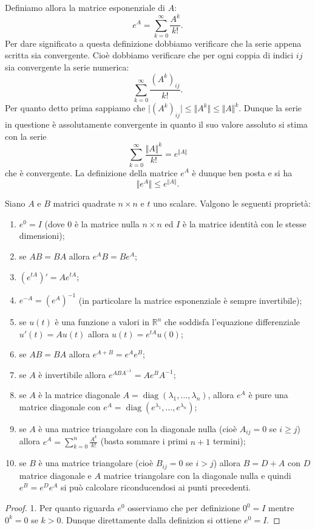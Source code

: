 \documentclass[italian,a4paper]{scrartcl}
\newcommand{\RR}{{\mathbb R}}
\DeclareMathOperator{\diag}{diag}
\begin{document}
Definiamo allora la matrice esponenziale di $A$:
\[
  e^A = \sum_{k=0}^\infty \frac{A^k}{k!}.
\]
Per dare significato a questa definizione dobbiamo verificare che la
serie appena scritta sia convergente. Cioè dobbiamo verificare che per
ogni coppia di indici $ij$ sia convergente la serie numerica:
\[
 \sum_{k=0}^\infty \frac{(A^k)_{ij}}{k!}.
\]
Per quanto detto prima sappiamo che $\lvert(A^k)_{ij}\rvert \le \Vert
A ^k\Vert \le \Vert A \Vert^k$. Dunque la serie in questione è
assolutamente convergente in quanto il suo valore assoluto si stima
con la serie
\[
 \sum_{k=0}^\infty \frac{\Vert A\Vert^k}{k!} = e^{\Vert A\Vert}
\]
che è convergente. La definizione della matrice $e^A$ è dunque 
ben posta e si ha
\[
 \Vert e^A\Vert \le e^{\Vert A \Vert}.
\]

\begin{theorem}
Siano $A$ e $B$ matrici quadrate $n\times n$ e $t$ uno scalare.
Valgono le seguenti proprietà:
\begin{enumerate}
\item $e^0 = I$ (dove $0$ è la matrice nulla $n\times n$ ed $I$ è la
  matrice identità con le stesse dimensioni);
\item se $AB=BA$ allora $e^AB = Be^A$;
\item $(e^{tA})' = A e^{tA}$;
\item $e^{-A} = (e^A)^{-1}$ (in particolare la matrice esponenziale è
  sempre invertibile);
\item se $u(t)$ è una funzione a valori in $\RR^n$ che soddisfa
  l'equazione differenziale $u'(t) = Au(t)$ allora $u(t) = e^{tA} u(0)$;
\item se $AB=BA$ allora $e^{A+B} = e^A e^B$;
\item se $A$ è invertibile allora $e^{ABA^{-1}} = Ae^BA^{-1}$;
\item se $A$ è la matrice diagonale $A = \diag(\lambda_1, \dots, \lambda_n)$, allora $e^A$
 è pure una matrice diagonale con $e^A = \diag(e^{\lambda_1},\dots, e^{\lambda_n})$;
\item se $A$ è una matrice triangolare con la diagonale nulla (cioè
  $A_{ij}=0$ se $i\ge j$) allora $e^A = \sum_{k=0}^n \frac{A^k}{k!}$
  (basta sommare i primi $n+1$ termini);
\item se $B$ è una matrice triangolare (cioè $B_{ij}=0$ se $i > j$)
  allora $B = D + A$ con $D$ matrice diagonale e $A$ matrice
  triangolare con la diagonale nulla e quindi $e^B = e^De^A$ si può
  calcolare riconducendosi ai punti precedenti.
\end{enumerate}
\begin{proof}
1. Per quanto riguarda $e^0$ osserviamo che per definizione $0^0=I$
mentre $0^k=0$ se $k>0$. Dunque direttamente dalla definizion si
ottiene $e^0=I$.


\end{proof}
\end{theorem}
\end{document}

